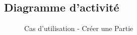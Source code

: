 \documentclass[a4paper,11pt]{article}
\begin{document}
\subsection{Diagramme d'activité}
\begin{figure}[ht!]
\caption{Cas d'utilisation - Créer une Partie}
\end{figure}
\newpage
\end{document}
